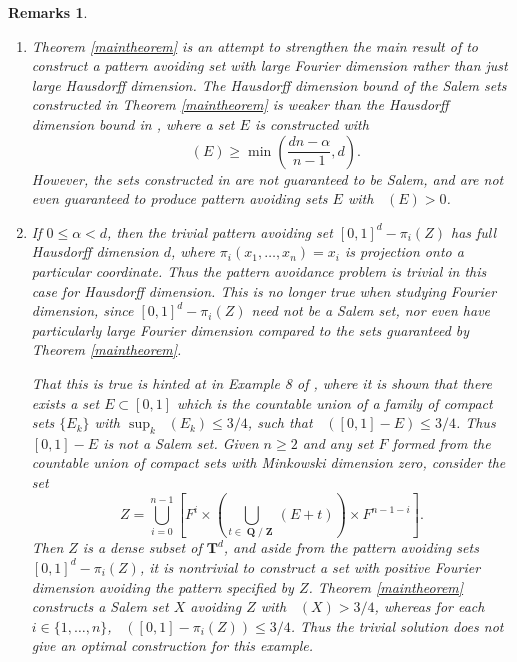 \documentclass[dvipsnames,letterpaper,12pt]{article}
\numberwithin{equation}{section}
\DeclareMathOperator{\minkdim}{\dim_{\mathbf{M}}}
\DeclareMathOperator{\hausdim}{\dim_{\mathbf{H}}}
\DeclareMathOperator{\fordim}{\dim_{\mathbf{F}}}
\DeclareMathOperator{\ZZ}{\mathbf{Z}}
\DeclareMathOperator{\QQ}{\mathbf{Q}}
\newtheorem{remarks}[theorem]{Remarks}
\numberwithin{theorem}{section}
\begin{document}
\begin{remarks}
    \ 
    \begin{enumerate}
        \item Theorem \ref{maintheorem} is an attempt to strengthen the main result of \cite{OurPaper} to construct a pattern avoiding set with large Fourier dimension rather than just large Hausdorff dimension. The Hausdorff dimension bound of the Salem sets constructed in Theorem \ref{maintheorem} is weaker than the Hausdorff dimension bound in \cite{OurPaper}, where a set $E$ is constructed with
        \[ \hausdim(E) \geq \min \left( \frac{dn - \alpha}{n - 1}, d \right). \]
        However, the sets constructed in \cite{OurPaper} are not guaranteed to be Salem, and are not even guaranteed to produce pattern avoiding sets $E$ with $\fordim(E) > 0$.

        \item If $0 \leq \alpha < d$, then the trivial pattern avoiding set $[0,1]^d - \pi_i(Z)$ has full Hausdorff dimension $d$, where $\pi_i(x_1,\dots,x_n) = x_i$ is projection onto a particular coordinate. Thus the pattern avoidance problem is trivial in this case for Hausdorff dimension. This is no longer true when studying Fourier dimension, since $[0,1]^d - \pi_i(Z)$ need not be a Salem set, nor even have particularly large Fourier dimension compared to the sets guaranteed by Theorem \ref{maintheorem}.

        That this is true is hinted at in Example 8 of \cite{Ekstrom2014}, where it is shown that there exists a set $E \subset [0,1]$ which is the countable union of a family of compact sets $\{ E_k \}$ with $\sup_k \minkdim(E_k) \leq 3/4$, such that $\fordim([0,1] - E) \leq 3/4$. Thus $[0,1] - E$ is not a Salem set. Given $n \geq 2$ and any set $F$ formed from the countable union of compact sets with Minkowski dimension zero, consider the set
        \[ Z = \bigcup_{i = 0}^{n-1} \left[ F^i \times  \left( \bigcup_{t \in \QQ / \ZZ} (E + t) \right) \times F^{n - 1 - i} \right]. \]
        Then $Z$ is a dense subset of $\mathbf{T}^d$, and aside from the pattern avoiding sets $[0,1]^d - \pi_i(Z)$, it is nontrivial to construct a set with positive Fourier dimension avoiding the pattern specified by $Z$. Theorem \ref{maintheorem} constructs a Salem set $X$ avoiding $Z$ with $\fordim(X) > 3/4$, whereas for each $i \in \{ 1, \dots, n \}$, $\fordim([0,1] - \pi_i(Z)) \leq 3/4$. Thus the trivial solution does not give an optimal construction for this example.
    \end{enumerate}
\end{remarks}
\end{document}

